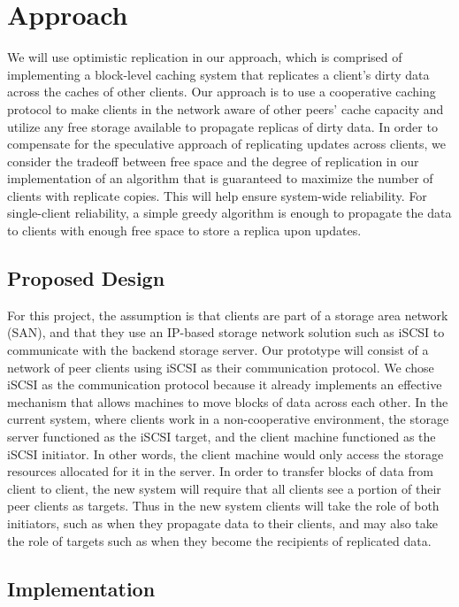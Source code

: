 \section{Approach}

We will use optimistic replication in our approach, which is
comprised of implementing a block-level caching system that
replicates a client's dirty data across the caches of other
clients. Our approach is to use a cooperative caching protocol
to make clients in the network aware of other peers' cache
capacity and utilize any free storage available to propagate
replicas of dirty data. In order to compensate for the
speculative approach of replicating updates across clients,
we consider the tradeoff between free space and the degree of
replication in our implementation of an algorithm that is
guaranteed to maximize the number of clients with replicate
copies. This will help ensure system-wide reliability. For
single-client reliability, a simple greedy algorithm is enough
to propagate the data to clients with enough free space to store
a replica upon updates.

\subsection{Proposed Design}

For this project, the assumption is that clients are part of a
storage area network (SAN), and that they use an IP-based storage
network solution such as iSCSI to communicate with the backend
storage server. Our prototype will consist of a network of peer
clients using iSCSI as their communication protocol. We chose
iSCSI as the communication protocol because it already implements
an effective mechanism that allows machines to move blocks of
data across each other. In the current system, where clients work
in a non-cooperative environment, the storage server functioned
as the iSCSI target, and the client machine functioned as the
iSCSI initiator. In other words, the client machine would only
access the storage resources allocated for it in the server. In
order to transfer blocks of data from client to client, the new
system will require that all clients see a portion of their peer
clients as targets. Thus in the new system clients will take the
role of both initiators, such as when they propagate data to their
clients, and may also take the role of targets such as when they
become the recipients of replicated data.

\subsection{Implementation}

